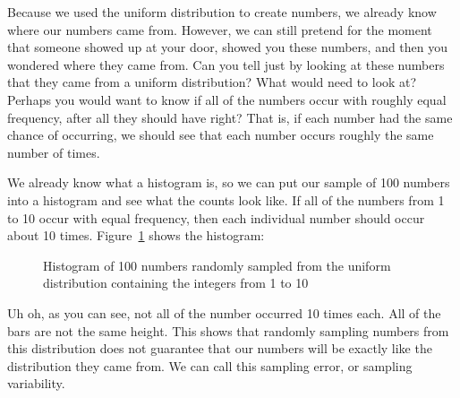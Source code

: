 \documentclass[
  letterpaper,
  DIV=11,
  numbers=noendperiod]{scrreprt}
\begin{document}
Because we used the uniform distribution to create numbers, we already
know where our numbers came from. However, we can still pretend for the
moment that someone showed up at your door, showed you these numbers,
and then you wondered where they came from. Can you tell just by looking
at these numbers that they came from a uniform distribution? What would
need to look at? Perhaps you would want to know if all of the numbers
occur with roughly equal frequency, after all they should have right?
That is, if each number had the same chance of occurring, we should see
that each number occurs roughly the same number of times.

We already know what a histogram is, so we can put our sample of 100
numbers into a histogram and see what the counts look like. If all of
the numbers from 1 to 10 occur with equal frequency, then each
individual number should occur about 10 times.
Figure~\ref{fig-5histunif} shows the histogram:

\begin{figure}


\caption{\label{fig-5histunif}Histogram of 100 numbers randomly sampled
from the uniform distribution containing the integers from 1 to 10}

\end{figure}%

Uh oh, as you can see, not all of the number occurred 10 times each. All
of the bars are not the same height. This shows that randomly sampling
numbers from this distribution does not guarantee that our numbers will
be exactly like the distribution they came from. We can call this
sampling error, or sampling variability.
\end{document}
